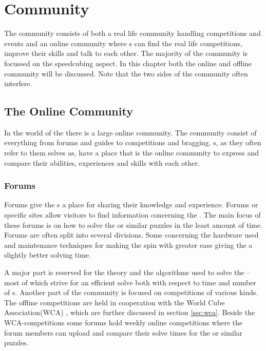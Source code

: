\chapter{Community}

The \rubik{} community consists of both a real life community handling competitions and events and an online community where \cuber{}s can find the real life competitions, improve their skills and talk to each other. The majority of the community is focussed on the speedcubing aspect. In this chapter both the online and offline community will be discussed. Note that the two sides of the community often interfere.

\section{The Online Community}
In the world of the \rubik{} there is a large online community. The community consist of everything from forums and guides to competitions and bragging. s, as they often refer to them selves as, have a place that is the online community to express and compare their abilities, experiences and skills with each other. 

\subsection{Forums}
Forums give the \cuber{}s a place for sharing their knowledge and experience\cite{speedsolving.com}\cite{speedcubing.dk}\cite{wca}. Forums or specific \rubik{} sites allow visitors to find information concerning the \rubik{}. The main focus of these forums is on how to solve the \rubik{} or similar puzzles in the least amount of time. Forums are often split into several divisions. Some concerning the hardware used and maintenance techniques for making the \rubik{} spin with greater ease giving the \cuber{} a slightly better solving time.

A major part is reserved for the theory and the algorithms used to solve the \rubik{} -- most of which strive for an efficient solve both with respect to time and number of \twist{}s.
Another part of the community is focused on competitions of various kinds. The offline competitions are held in cooperation with the World Cube Association(WCA) \cite{wca}, which are further discussed in section \ref{sec:wca}. Beside the WCA-competitions some forums hold weekly online competitions where the forum members can upload and compare their solve times for the \rubik{} or similar puzzles. 

